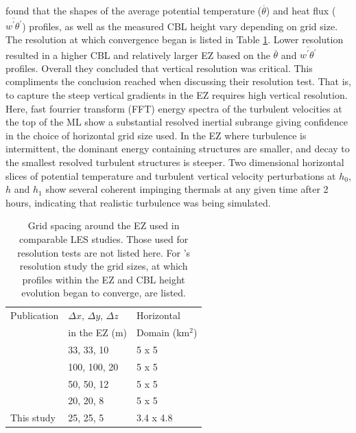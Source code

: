\cite{SullPat} found that the shapes of the average potential temperature ($\overline{\theta}$) and heat flux ($\overline{w^{'}\theta^{'}}$) profiles, as well as the measured CBL height vary depending on grid size.  The resolution at which convergence began is listed in Table \ref{table:gridcomp}.  Lower resolution resulted in a higher CBL and relatively larger EZ based on the $\overline{\theta}$ and $\overline{w^{'}\theta^{'}}$ profiles.  Overall they concluded that vertical resolution was critical.  This compliments the conclusion \cite{BrooksFowler2} reached when discussing their resolution test.  That is, to capture the steep vertical gradients in the EZ requires high vertical resolution. \\

Here, fast fourrier transform (FFT) energy spectra of the turbulent velocities at the top of the ML show a substantial resolved inertial subrange giving confidence in the choice of horizontal grid size used. In the EZ where turbulence is intermittent, the dominant energy containing structures are smaller, and decay to the smallest resolved turbulent structures is steeper. Two dimensional horizontal slices of potential temperature and turbulent vertical velocity perturbations at $h_{0}$, $h$ and $h_{1}$ show several coherent impinging thermals at any given time after 2 hours, indicating that realistic turbulence was being simulated.\\

\begin{table}[htbp]
\caption[Comparison of Grid-Sizes used in similar Studies]{Grid spacing around the EZ used in comparable LES studies. Those used for resolution tests are not listed here.  For \cite{SullPat}'s resolution study the grid sizes, at which profiles within the EZ and CBL height evolution began to converge, are listed.}

    \begin{tabular}{p{4cm} p{2cm} p{2cm}}
Publication & $\Delta x$, $\Delta y$, $\Delta z$ & Horizontal \\
 & in the EZ (m) & Domain (km$^{2}$) \\ \hline
      \cite{SullMoengStev}& 33, 33, 10 & 5 x 5 \\ 
      \cite{FedConzMir04}& 100, 100, 20 & 5 x 5 \\ 
      \cite{BrooksFowler2}& 50, 50, 12 & 5 x 5 \\
      \cite{SullPat} &  20, 20, 8 & 5 x 5\\
      This study & 25, 25, 5 &  3.4 x 4.8\\ \hline       
    \end{tabular}
\label{table:gridcomp}   
\end{table}

